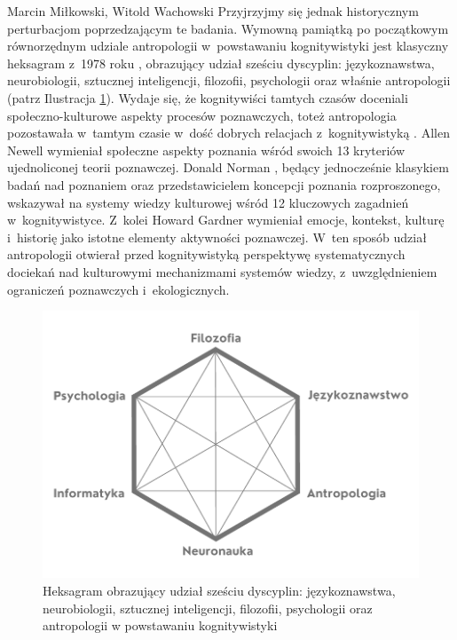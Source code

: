 \begin{artplenv2auth}{Marcin Miłkowski, Witold Wachowski}
Przyjrzyjmy się jednak historycznym perturbacjom poprzedzającym te badania. Wymowną pamiątką po początkowym równorzędnym udziale antropologii w~powstawaniu kognitywistyki jest klasyczny heksagram z~1978 roku
\parencite[zob. np. ][]{miller_cognitive_2003}, %
 obrazujący udział sześciu dyscyplin: językoznawstwa, neurobiologii, sztucznej inteligencji, filozofii, psychologii oraz właśnie antropologii (patrz Ilustracja \ref{fig1milk}). Wydaje się, że kognitywiści tamtych czasów doceniali społeczno-kulturowe aspekty procesów poznawczych, toteż antropologia pozostawała w~tamtym czasie w~dość dobrych relacjach z~kognitywistyką 
\parencite[][]{bender_anthropology_2010}. %
 Allen Newell 
\parencites*[][]{newell_physical_1980}[][]{newell_unified_1990} %
 wymieniał społeczne aspekty poznania wśród swoich 13 kryteriów ujednoliconej teorii poznawczej. Donald Norman 
\parencite*[][]{norman_twelve_1981}, %
 będący jednocześnie klasykiem badań nad poznaniem oraz przedstawicielem koncepcji poznania rozproszonego, wskazywał na systemy wiedzy kulturowej wśród 12 kluczowych zagadnień w~kognitywistyce. Z~kolei Howard Gardner 
\parencite*[][]{gardner_minds_1985} %
 wymieniał emocje, kontekst, kulturę i~historię jako istotne elementy aktywności poznawczej. W~ten sposób udział antropologii otwierał przed kognitywistyką perspektywę systematycznych dociekań nad kulturowymi mechanizmami systemów wiedzy, z~uwzględnieniem ograniczeń poznawczych i~ekologicznych.
 

\begin{figure}
\begin{center}
 \includegraphics[width=.9\textwidth]{ART_milkowski/ilustracja1pu.pdf}
\end{center}
 \caption{Heksagram obrazujący udział sześciu dyscyplin: językoznawstwa, neurobiologii, sztucznej inteligencji, filozofii, psychologii oraz antropologii w powstawaniu kognitywistyki}\label{fig1milk}
\end{figure}


\end{artplenv2auth}

